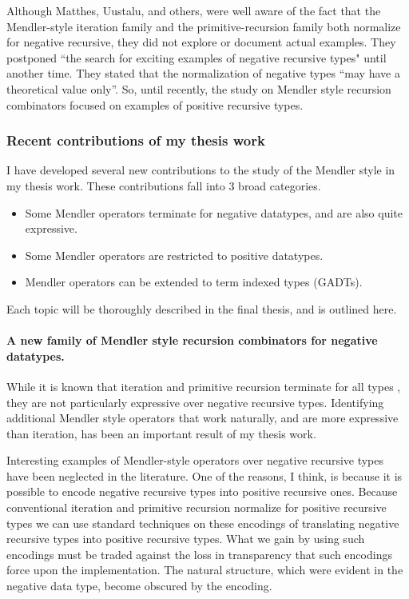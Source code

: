Although Matthes, Uustalu, and others, were well aware of the fact that
the Mendler-style iteration family and the primitive-recursion family both
normalize for negative recursive, they did not explore or document actual
examples. They postponed ``the search for exciting examples of negative
recursive types" until another time. They stated that the normalization
of negative types ``may have a theoretical value
only''\cite{UusVen99}. So, until recently, the study on Mendler style recursion
combinators focused on examples of positive recursive types.

\subsubsection{Recent contributions of my thesis work}
I have developed several new contributions to the study of the Mendler style
in my thesis work. These contributions fall into 3 broad categories.
\begin{itemize}
\item Some Mendler operators terminate for negative datatypes, and are also quite expressive.
\item Some Mendler operators are restricted to positive datatypes.
\item Mendler operators can be extended to term indexed types (GADTs).
\end{itemize}
Each topic will be thoroughly described in the final thesis, and is outlined here.


\paragraph{A new family of Mendler style recursion combinators for negative datatypes.}

While it is known that iteration and primitive recursion terminate for all types
\cite{AbeMatUus05,AbeMat04}, they are not particularly expressive over negative
recursive types. Identifying additional Mendler style operators that work
naturally, and are more expressive than iteration, has been an important result
of my thesis work.

Interesting examples of Mendler-style operators over negative recursive types
have been neglected in the literature. One of the reasons, I think, is because
it is possible to encode negative recursive types into positive recursive ones. Because conventional iteration and primitive recursion normalize for
positive recursive types we can use standard techniques on these encodings
of translating negative recursive types into positive recursive types.
What we gain by using such encodings must be traded against the loss in
transparency that such encodings force upon the implementation. The natural
structure, which were evident in the negative data type, become obscured by
the encoding.


